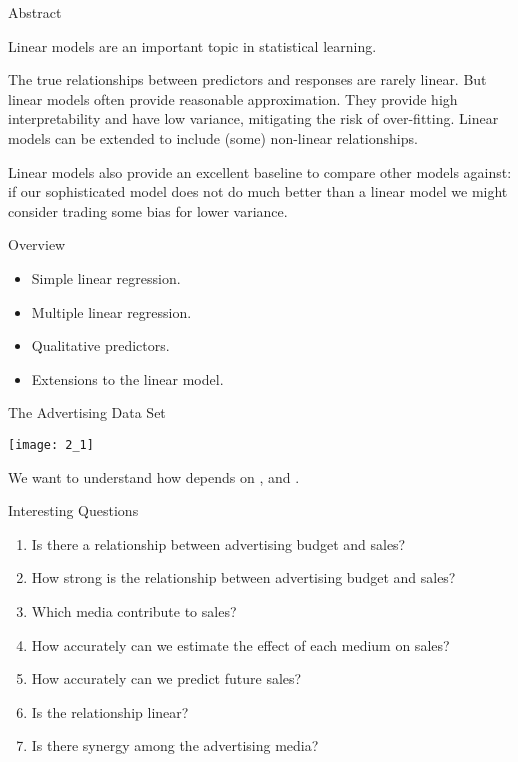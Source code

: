 \documentclass[mathserif, aspectratio=169]{beamer}
\subtitle{\bfseries%
  {Linear Regression}\\%
  {\tiny\it linear models, least square fit, simple \& multiple linear regression, qualitative predictors}\\%
}
\begin{document}


\begin{frame}{Abstract}

	\begin{blurb}
		Linear models are an important topic in statistical learning.  

		The true relationships between predictors and responses are rarely linear.
		But linear models often provide reasonable approximation. They provide
		high interpretability and have low variance, mitigating the risk of over-fitting.
		Linear models can be extended to include (some) non-linear relationships. 

		Linear models also provide an excellent baseline to compare other models against: if 
		our sophisticated model does not do much better than a linear model we might consider
		trading some bias for lower variance.
	\end{blurb}
\end{frame}

\begin{frame}{Overview}
	\begin{itemize}
		\item Simple linear regression.
		\item Multiple linear regression.
		\item Qualitative predictors.
		\item Extensions to the linear model.
	\end{itemize}
\end{frame}

\begin{frame}{The Advertising Data Set}
	\begin{center}
		\texttt{[image: 2\_1]}

		We want to understand how  depends on ,  and .
	\end{center}
\end{frame}

\begin{frame}{Interesting Questions}
	\begin{enumerate}
		\item Is there a relationship between advertising budget and sales?
		\item How strong is the relationship between advertising budget and sales?
		\item Which media contribute to sales?
		\item How accurately can we estimate the effect of each medium on sales?
		\item How accurately can we predict future sales?
		\item Is the relationship linear?
		\item Is there synergy among the advertising media?
	\end{enumerate}
\end{frame}
\end{document}
